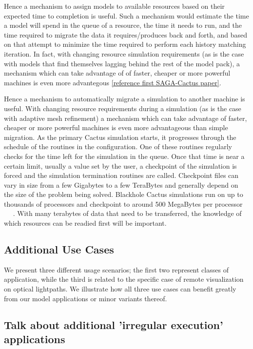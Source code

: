 \documentclass[conference,final]{IEEEtran}
\begin{document}
Hence a mechanism to assign models to available resources based on their
expected time to completion is useful. Such a mechanism would estimate the time
a model will spend in the queue of a resource, the time it needs to run, and the time
required to migrate the data it requires/produces back and forth, and based on that
attempt to minimize the time required to perform each history matching iteration.
In fact, with changing resource simulation requirements 
(as is the case with models that find themselves
lagging behind the rest of the model pack), a mechanism which can take
advantage of of faster, cheaper or more powerful machines is even more
advantegous \ref{reference first SAGA-Cactus paper}.

Hence a mechanism to automatically migrate a
simulation to another machine is useful. With changing resource
requirements during a simulation (as is the case with adaptive mesh
refinement) a mechanism which can take advantage of faster, cheaper or
more powerful machines is even more advantageous than simple
migration. As the primary Cactus simulation starts, it progresses
through the schedule of the routines in the configuration. One of
these routines regularly checks for the time left for the simulation
in the queue. Once that time is near a certain limit, usually a value
set by the user, a checkpoint of the simulation is forced and the
simulation termination routines are called. Checkpoint files can vary
in size from a few Gigabytes to a few TeraBytes and generally depend
on the size of the problem being solved. Blackhole Cactus simulations
run on up to thousands of processors and checkpoint to around 500
MegaBytes per processor ~\cite{Cactus_CCTTR} ~\cite{Cactus_Kamil06a}
~\cite{Cactus_Shalf05a}. With many terabytes of data that need to be
transferred, the knowledge of which resources can be readied first
will be important.

\subsection{Additional Use Cases}
We present three different usage scenarios; the first two represent
classes of application, while the third is related to the specific
case of remote visualization on optical lightpaths. We illustrate how
all three use cases can benefit greatly from our model applications or
minor variants thereof.

\subsection{Talk about additional 'irregular execution' applications}
\end{document}
